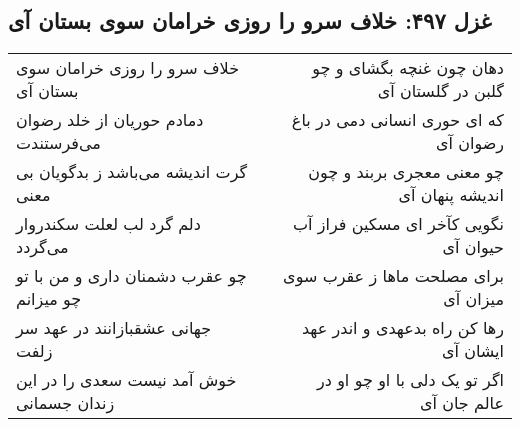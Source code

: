 \begin{center}
\section*{غزل ۴۹۷: خلاف سرو را روزی خرامان سوی بستان آی}
\label{sec:497}
\begin{longtable}{l p{0.5cm} r}
خلاف سرو را روزی خرامان سوی بستان آی
&&
دهان چون غنچه بگشای و چو گلبن در گلستان آی
\\
دمادم حوریان از خلد رضوان می‌فرستندت
&&
که ای حوری انسانی دمی در باغ رضوان آی
\\
گرت اندیشه می‌باشد ز بدگویان بی معنی
&&
چو معنی معجری بربند و چون اندیشه پنهان آی
\\
دلم گرد لب لعلت سکندروار می‌گردد
&&
نگویی کآخر ای مسکین فراز آب حیوان آی
\\
چو عقرب دشمنان داری و من با تو چو میزانم
&&
برای مصلحت ماها ز عقرب سوی میزان آی
\\
جهانی عشقبازانند در عهد سر زلفت
&&
رها کن راه بدعهدی و اندر عهد ایشان آی
\\
خوش آمد نیست سعدی را در این زندان جسمانی
&&
اگر تو یک دلی با او چو او در عالم جان آی
\\
\end{longtable}
\end{center}
